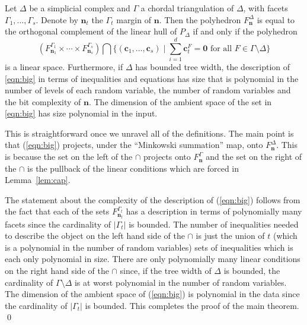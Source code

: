 \documentclass{elsart}
\newcommand{\nn}{\mathbf{n}}
\begin{document}
\begin{thm}\label{thm:prog}
Let $\Delta$ be a simplicial complex and $\Gamma$ a chordal
triangulation of $\Delta$, with facets $\Gamma_1, \ldots, \Gamma_s$.
Denote by $\nn_t$ the $\Gamma_t$ margin of $\nn$.
Then the polyhedron  $F^\Delta_\nn$ is equal to the orthogonal
complement of the linear hull of $P_\Delta$ if
and only if the  polyhedron
\begin{equation}\label{eqn:big}(F^{\Gamma_1}_{\nn_1} \times
  \cdots  \times   F^{\Gamma_s}_{\nn_s}) \bigcap \{ (\mathbf{c}_1,
  \ldots, \mathbf{c}_s) \mid
  \sum_{i = 1}^d \mathbf{c}_t^F = \mathbf{0} \text{ for all } F \in
  \Gamma \setminus \Delta \}
\end{equation}
is a linear space.  Furthermore, if $\Delta$ has bounded
tree width, the description of \ref{eqn:big} in terms of inequalities
and equations has size that is polynomial in the number of levels of
each random variable, the number of random variables and the bit
complexity of $\nn$.  The dimension of the ambient space of the 
set in \ref{eqn:big} has size polynomial in the input.
\end{thm}
\begin{pf}
This is straightforward once we unravel all of the
definitions.  The main point is that (\ref{eqn:big}) projects, under the
``Minkowski summation'' map, onto $F^\Delta_\nn$.  This is because the
set on the left of the $\cap$ projects onto $F^{\Gamma}_\nn$ and
the set on the right of the $\cap$ is the pullback of the linear
conditions which are forced in Lemma~\ref{lem:cap}.

The statement about the complexity of the description of
(\ref{eqn:big}) follows from the fact that each of the sets $F^{\Gamma_t}_{\nn_t}$ has
a description  in terms of polynomially many
facets since the cardinality of $|\Gamma_t|$ is bounded.  The number
of inequalities 
needed to describe the object on the left hand side of the $\cap$ is
just the union of $t$ (which is a polynomial in the number of random
variables) sets of inequalities which is each only polynomial in
size.  There are only polynomially many linear conditions on the right
hand side of the $\cap$ since, if the tree width of $\Delta$ is
bounded, the cardinality of $\Gamma \setminus \Delta$ is at worst
polynomial in the number of random variables.  The dimension of the
ambient space of (\ref{eqn:big}) is polynomial in the data since the
cardinality of  $|\Gamma_t|$ is bounded.  This completes the proof of
the main theorem. 
\qed
\end{pf}
\end{document}
